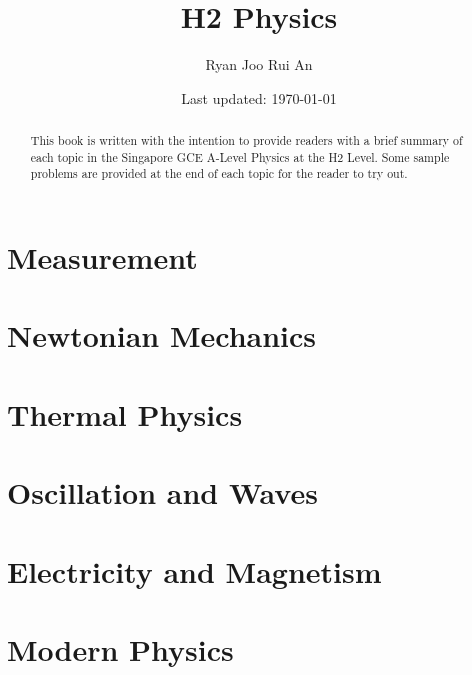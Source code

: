 \documentclass[12pt,a4 paper]{article}
\begin{document}
\begin{titlepage}
    \title{\textbf{H2 Physics}}
	\author{Ryan Joo Rui An}
	\date{Last updated: \today}
\end{titlepage}

\maketitle

\begin{abstract}
This book is written with the intention to provide readers with a brief summary of each topic in the Singapore GCE A-Level Physics at the H2 Level. Some sample problems are provided at the end of each topic for the reader to try out.
\end{abstract}
\pagebreak

\tableofcontents
\pagebreak

\part{Measurement}


\part{Newtonian Mechanics}







\part{Thermal Physics}



\part{Oscillation and Waves}




\part{Electricity and Magnetism}







\part{Modern Physics}


\end{document}
